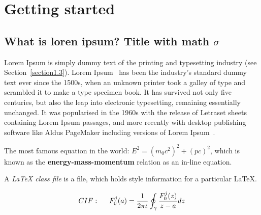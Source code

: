 \chapter{Getting started}  %

\section{What is loren ipsum? Title with math \texorpdfstring{$\sigma$}{[sigma]}} %

Lorem Ipsum is simply dummy text of the printing and typesetting industry (see 
Section~\ref{section1.3}). Lorem Ipsum~\citep{Aup91} has been the industry's 
standard dummy text ever since the 1500s, when an unknown printer took a galley 
of type and scrambled it to make a type specimen book. It has survived not only 
five centuries, but also the leap into electronic typesetting, remaining 
essentially unchanged. It was popularised in the 1960s with the release of 
Letraset sheets containing Lorem Ipsum passages, and more recently with desktop 
publishing software like Aldus PageMaker including versions of Lorem 
Ipsum~\citep{AAB95,Con90,LM65}.

The most famous equation in the world: $E^2 = (m_0c^2)^2 + (pc)^2$, which is 
known as the \textbf{energy-mass-momentum} relation as an in-line equation.

A {\em \LaTeX{} class file} is a file, which holds style information for a particular \LaTeX{}.


\begin{align}
CIF: \hspace*{5mm}F_0^j(a) = \frac{1}{2\pi \iota} \oint_{\gamma} \frac{F_0^j(z)}{z - a} dz
\end{align}

\nomenclature[g-p]{$\pi$}{ $\simeq 3.14\ldots$}                                             %


